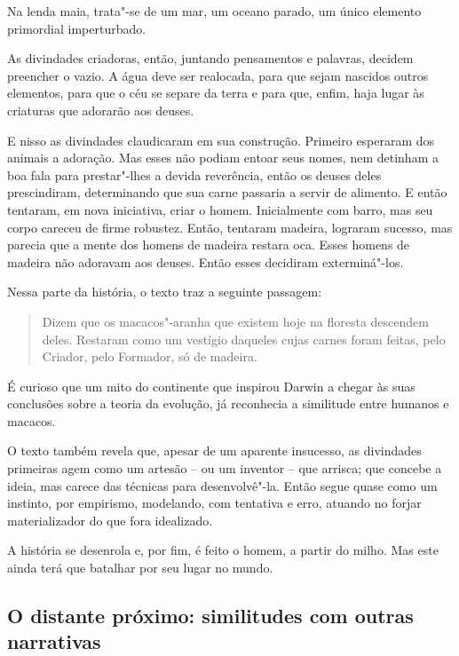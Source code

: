 \documentclass[11pt]{extarticle}
\begin{document}
Na lenda maia, trata"-se de um mar, um oceano parado, um único elemento
primordial imperturbado.

As divindades criadoras, então, juntando pensamentos e palavras, decidem
preencher o vazio. A água deve ser realocada, para que sejam nascidos
outros elementos, para que o céu se separe da terra e para que, enfim,
haja lugar às criaturas que adorarão aos deuses.

E nisso as divindades claudicaram em sua construção. Primeiro esperaram
dos animais a adoração. Mas esses não podiam entoar seus nomes, nem
detinham a boa fala para prestar"-lhes a devida reverência, então os
deuses deles prescindiram, determinando que sua carne passaria a servir
de alimento. E então tentaram, em nova iniciativa, criar o homem.
Inicialmente com barro, mas seu corpo careceu de firme robustez. Então,
tentaram madeira, lograram sucesso, mas parecia que a mente dos homens
de madeira restara oca. Esses homens de madeira não adoravam aos deuses.
Então esses decidiram exterminá"-los.

Nessa parte da história, o texto traz a seguinte passagem:

\begin{quote}
Dizem que os macacos"-aranha que existem hoje na floresta descendem
deles. Restaram como um vestígio daqueles cujas carnes foram feitas,
pelo Criador, pelo Formador, só de madeira.
\end{quote}

É curioso que um mito do continente que inspirou Darwin a chegar às suas
conclusões sobre a teoria da evolução, já reconhecia a similitude entre
humanos e macacos.

O texto também revela que, apesar de um aparente insucesso, as
divindades primeiras agem como um artesão -- ou um inventor -- que
arrisca; que concebe a ideia, mas carece das técnicas para
desenvolvê"-la. Então segue quase como um instinto, por empirismo,
modelando, com tentativa e erro, atuando no forjar materializador do que
fora idealizado.

A história se desenrola e, por fim, é feito o homem, a partir do milho.
Mas este ainda terá que batalhar por seu lugar no mundo.





\subsection{O distante próximo: similitudes com outras narrativas}
\end{document}
